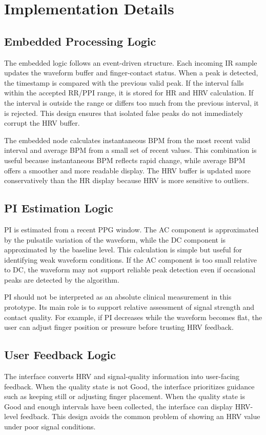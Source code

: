\documentclass[10pt,conference]{IEEEtran}
\begin{document}
\section{Implementation Details}
\subsection{Embedded Processing Logic}
The embedded logic follows an event-driven structure. Each incoming IR sample updates the waveform buffer and finger-contact status. When a peak is detected, the timestamp is compared with the previous valid peak. If the interval falls within the accepted RR/PPI range, it is stored for HR and HRV calculation. If the interval is outside the range or differs too much from the previous interval, it is rejected. This design ensures that isolated false peaks do not immediately corrupt the HRV buffer.

The embedded node calculates instantaneous BPM from the most recent valid interval and average BPM from a small set of recent values. This combination is useful because instantaneous BPM reflects rapid change, while average BPM offers a smoother and more readable display. The HRV buffer is updated more conservatively than the HR display because HRV is more sensitive to outliers.

\subsection{PI Estimation Logic}
PI is estimated from a recent PPG window. The AC component is approximated by the pulsatile variation of the waveform, while the DC component is approximated by the baseline level. This calculation is simple but useful for identifying weak waveform conditions. If the AC component is too small relative to DC, the waveform may not support reliable peak detection even if occasional peaks are detected by the algorithm.

PI should not be interpreted as an absolute clinical measurement in this prototype. Its main role is to support relative assessment of signal strength and contact quality. For example, if PI decreases while the waveform becomes flat, the user can adjust finger position or pressure before trusting HRV feedback.

\subsection{User Feedback Logic}
The interface converts HRV and signal-quality information into user-facing feedback. When the quality state is not Good, the interface prioritizes guidance such as keeping still or adjusting finger placement. When the quality state is Good and enough intervals have been collected, the interface can display HRV-level feedback. This design avoids the common problem of showing an HRV value under poor signal conditions.
\end{document}

